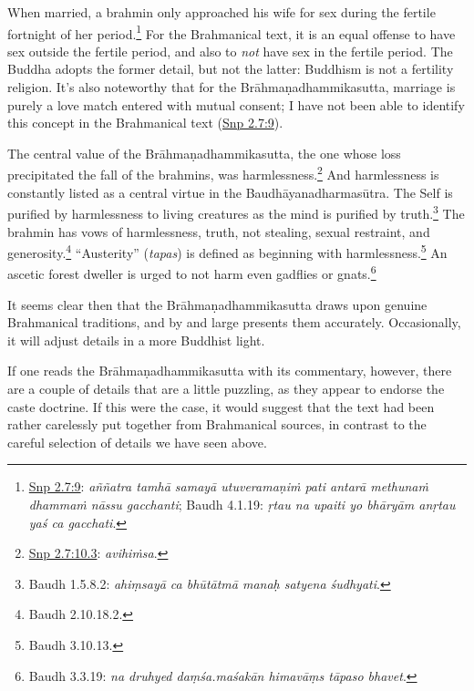 \documentclass[12pt,openany]{book}%
\begin{document}
When married, a brahmin only approached his wife for sex during the fertile fortnight of her period.\footnote{\href{https://suttacentral.net/snp2.7/en/sujato\#9}{Snp 2.7:9}: \textit{\textsanskrit{aññatra} \textsanskrit{tamhā} \textsanskrit{samayā} \textsanskrit{utuveramaṇiṁ} pati \textsanskrit{antarā} \textsanskrit{methunaṁ} \textsanskrit{dhammaṁ} \textsanskrit{nāssu} gacchanti}; Baudh 4.1.19: \textit{\textsanskrit{ṛtau} na upaiti yo \textsanskrit{bhāryām} \textsanskrit{anṛtau} \textsanskrit{yaś} ca gacchati}. } For the Brahmanical text, it is an equal offense to have sex outside the fertile period, and also to \emph{not} have sex in the fertile period. The Buddha adopts the former detail, but not the latter: Buddhism is not a fertility religion. It’s also noteworthy that for the \textsanskrit{Brāhmaṇadhammikasutta}, marriage is purely a love match entered with mutual consent; I have not been able to identify this concept in the Brahmanical text (\href{https://suttacentral.net/snp2.7/en/sujato\#9}{Snp 2.7:9}).

The central value of the \textsanskrit{Brāhmaṇadhammikasutta}, the one whose loss precipitated the fall of the brahmins, was harmlessness.\footnote{\href{https://suttacentral.net/snp2.7/en/sujato\#10.3}{Snp 2.7:10.3}: \textit{\textsanskrit{avihiṁsa}}. } And harmlessness is constantly listed as a central virtue in the \textsanskrit{Baudhāyanadharmasūtra}. The Self is purified by harmlessness to living creatures as the mind is purified by truth.\footnote{Baudh 1.5.8.2: \textit{\textsanskrit{ahiṃsayā} ca \textsanskrit{bhūtātmā} manaḥ satyena \textsanskrit{śudhyati}}. } The brahmin has vows of harmlessness, truth, not stealing, sexual restraint, and generosity.\footnote{Baudh 2.10.18.2. } “Austerity” (\textit{tapas}) is defined as beginning with harmlessness.\footnote{Baudh 3.10.13. } An ascetic forest dweller is urged to not harm even gadflies or gnats.\footnote{Baudh 3.3.19: \textit{na druhyed \textsanskrit{daṃśa}.\textsanskrit{maśakān} \textsanskrit{himavāṃs} \textsanskrit{tāpaso} bhavet}. }

It seems clear then that the \textsanskrit{Brāhmaṇadhammikasutta} draws upon genuine Brahmanical traditions, and by and large presents them accurately. Occasionally, it will adjust details in a more Buddhist light.

If one reads the \textsanskrit{Brāhmaṇadhammikasutta} with its commentary, however, there are a couple of details that are a little puzzling, as they appear to endorse the caste doctrine. If this were the case, it would suggest that the text had been rather carelessly put together from Brahmanical sources, in contrast to the careful selection of details we have seen above.
\end{document}
